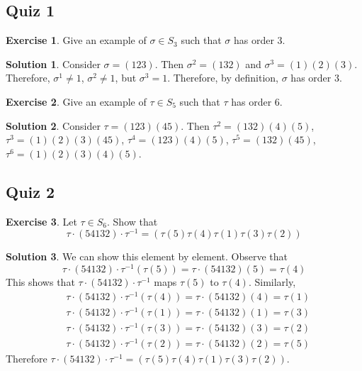 \documentclass[12pt]{article}
\theoremstyle{definition}
\newtheorem{exercise}{\color{YellowOrange}Exercise}
\theoremstyle{definition}
\newtheorem{solution}{\color{Goldenrod}Solution}
\begin{document}
\subsection{Quiz 1}

\begin{exercise}
Give an example of $\sigma \in S_3$ such that $\sigma$ has order 3. 
\end{exercise}
\begin{solution}
Consider $\sigma = (1 2 3)$. Then $\sigma^2 = (1 3 2)$ and $\sigma^3 = (1)(2)(3)$. Therefore, $\sigma^1 \neq 1$, $\sigma^2 \neq 1$, but $\sigma^3 = 1$. Therefore, by definition, $\sigma$ has order $3$.
\end{solution}

\begin{exercise}
Give an example of $\tau \in S_5$ such that $\tau$ has order 6. 
\end{exercise}
\begin{solution}
Consider $\tau = (123)(45)$. Then $\tau^2 = (132)(4)(5)$, $\tau^3 = (1)(2)(3)(45)$, $\tau^4 = (123)(4)(5)$, $\tau^5 = (132)(45)$, $\tau^6 = (1)(2)(3)(4)(5)$.
\end{solution}

\subsection{Quiz 2}
\begin{exercise}
Let $\tau \in S_6$. Show that
\begin{equation*}
\tau \cdot (5 4 1 3 2) \cdot \tau^{-1} = (\tau(5) \tau(4) \tau(1) \tau(3) \tau(2))
\end{equation*}
\end{exercise}

\begin{solution}
We can show this element by element. Observe that
\begin{equation}
	\tau \cdot (54132) \cdot \tau^{-1}(\tau(5)) = \tau \cdot (54132)(5) = \tau(4)
\end{equation}
This shows that $\tau \cdot (54132) \cdot \tau^{-1}$ maps $\tau(5)$ to $\tau(4)$. Similarly,
\begin{align}
&\tau \cdot (54132) \cdot \tau^{-1}(\tau(4)) = \tau \cdot (54132)(4) = \tau(1) \\
&\tau \cdot (54132) \cdot \tau^{-1}(\tau(1)) = \tau \cdot (54132)(1) = \tau(3) \\
&\tau \cdot (54132) \cdot \tau^{-1}(\tau(3)) = \tau \cdot (54132)(3) = \tau(2) \\
&\tau \cdot (54132) \cdot \tau^{-1}(\tau(2)) = \tau \cdot (54132)(2) = \tau(5) 
\end{align}
Therefore $\tau \cdot (5 4 1 3 2) \cdot \tau^{-1} = (\tau(5) \tau(4) \tau(1) \tau(3) \tau(2))
$.
\end{solution}		
\end{document}

